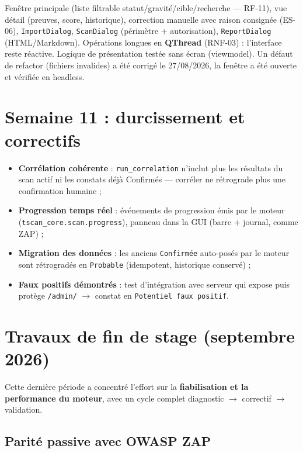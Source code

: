\documentclass[11pt,a4paper]{report}
\newcommand{\code}[1]{\texttt{#1}}
\begin{document}
Fenêtre principale (liste filtrable statut/gravité/cible/recherche --- RF-11), vue détail
(preuves, score, historique), correction manuelle avec raison consignée (ES-06),
\code{ImportDialog}, \code{ScanDialog} (périmètre + autorisation), \code{ReportDialog}
(HTML/Markdown). Opérations longues en \textbf{QThread} (RNF-03) : l'interface reste
réactive. Logique de présentation testée sans écran (viewmodel). Un défaut de refactor
(fichiers invalides) a été corrigé le 27/08/2026, la fenêtre a été ouverte et vérifiée en
headless.

\section{Semaine 11 : durcissement et correctifs}

\begin{itemize}[leftmargin=1.5em]
  \item \textbf{Corrélation cohérente} : \code{run\_correlation} n'inclut plus les
        résultats du scan actif ni les constats déjà Confirmés --- corréler ne rétrograde
        plus une confirmation humaine ;
  \item \textbf{Progression temps réel} : événements de progression émis par le moteur
        (\code{tscan\_core.scan.progress}), panneau dans la GUI (barre + journal, comme
        ZAP) ;
  \item \textbf{Migration des données} : les anciens \code{Confirmée} auto-posés par le
        moteur sont rétrogradés en \code{Probable} (idempotent, historique conservé) ;
  \item \textbf{Faux positifs démontrés} : test d'intégration avec serveur qui expose puis
        protège \code{/admin/} $\rightarrow$ constat en \code{Potentiel faux positif}.
\end{itemize}

\section{Travaux de fin de stage (septembre 2026)}

Cette dernière période a concentré l'effort sur la \textbf{fiabilisation et la performance
du moteur}, avec un cycle complet diagnostic $\rightarrow$ correctif $\rightarrow$
validation.

\subsection{Parité passive avec OWASP ZAP}
\end{document}
